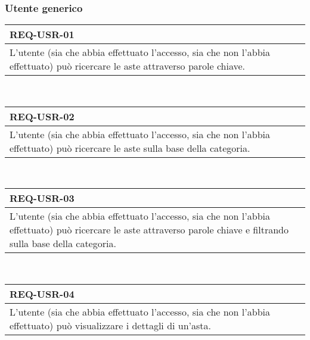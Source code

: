             \subsubsection{Utente generico}
                \begin{tabular}{|p{}|}
                    \hline
                    \multicolumn{1}{|l|}{\cellcolor{head}\textbf{REQ-USR-01}} \\
                    \hline
                    L'utente (sia che abbia effettuato l'accesso, sia che non l'abbia effettuato) può ricercare le aste attraverso parole chiave. \\
                    \hline
                \end{tabular} \smallskip \\
                \begin{tabular}{|p{}|}
                    \hline
                    \multicolumn{1}{|l|}{\cellcolor{head}\textbf{REQ-USR-02}} \\
                    \hline
                    L'utente (sia che abbia effettuato l'accesso, sia che non l'abbia effettuato) può ricercare le aste sulla base della categoria. \\
                    \hline
                \end{tabular} \smallskip \\
                \begin{tabular}{|p{}|}
                    \hline
                    \multicolumn{1}{|l|}{\cellcolor{head}\textbf{REQ-USR-03}} \\
                    \hline
                    L'utente (sia che abbia effettuato l'accesso, sia che non l'abbia effettuato) può ricercare le aste attraverso parole chiave e filtrando sulla base della categoria. \\
                    \hline
                \end{tabular} \smallskip \\
                \begin{tabular}{|p{}|}
                    \hline
                    \multicolumn{1}{|l|}{\cellcolor{head}\textbf{REQ-USR-04}} \\
                    \hline
                    L'utente (sia che abbia effettuato l'accesso, sia che non l'abbia effettuato) può visualizzare i dettagli di un'asta. \\
                    \hline
                \end{tabular} \smallskip \\
